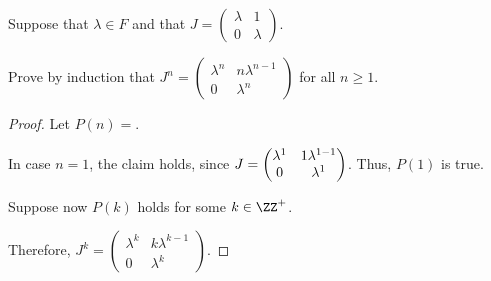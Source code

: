 \documentclass[11pt]{scrartcl}
\begin{document}
\begin{problem*}
\hfill

Suppose that $\lambda\in F$ and that
$J = \left(\begin{matrix} \lambda & 1 \\ 0 &
    \lambda\end{matrix}\right)$.  

Prove by induction that
$J^n = \left(\begin{matrix} \lambda^n & n \lambda^{n-1} \\ 0 &
    \lambda^n\end{matrix}\right)$ for all $n \ge 1$.
\end{problem*}

\begin{proof}
  \hfill

  Let $P(n)=$.

In case $n=1$, the claim holds, since 
$    J = \begin{pmatrix} 
      \lambda^1 & 1\*\lambda^{1-1} \\
      0         & \lambda^1
    \end{pmatrix}
$. Thus, $P(1)$ is true.

Suppose now $P(k)$ holds for some $k\in\ZZ^+$.

Therefore, 
$
    J^k = \begin{pmatrix} 
      \lambda^k & k\lambda^{k-1} \\
      0         & \lambda^k
    \end{pmatrix}
$.


\end{proof}
\end{document}
